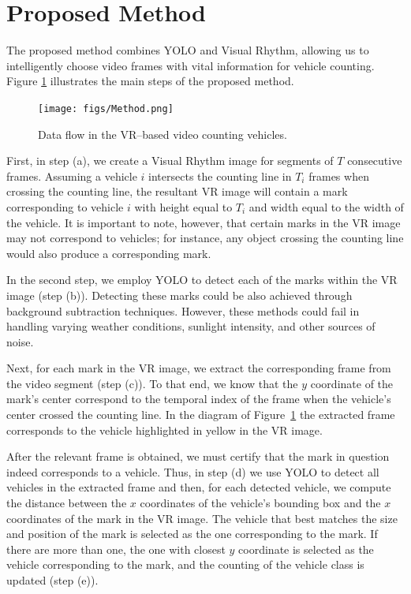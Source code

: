 \documentclass[10pt,conference]{IEEEtran}
\newcommand{\nina}[1]{{\color{purple}#1}}
\begin{document}
\section{Proposed Method}
The proposed method combines YOLO and Visual Rhythm, allowing us to intelligently choose video frames with vital information for vehicle counting. %
Figure \ref{fig:method} illustrates the main steps of the proposed method.

\begin{figure}[!t]
    \centering
    \texttt{[image: figs/Method.png]}
    \caption{Data flow in the VR–based video counting vehicles.}
    \label{fig:method}
\end{figure}

First, in step (a), we create a Visual Rhythm image for segments of $T$ consecutive frames. Assuming a vehicle $i$ intersects the counting line in $T_i$ frames when crossing the counting line, the resultant VR image will contain a mark corresponding to vehicle $i$ with height equal to $T_i$ and width equal to the width of the vehicle. It is important to note, however, that certain marks in the VR image may not correspond to vehicles; for instance, any object crossing the counting line would also produce a corresponding mark. 

In the second step, we employ YOLO to detect each of the marks within the VR image (step (b)). Detecting these marks could be also achieved through background subtraction techniques. However, these methods could fail in handling varying weather conditions, sunlight intensity, and other sources of noise.

Next, for each mark in the VR image, we extract the corresponding frame from the video segment (step (c)). To that end, we know that the $y$ coordinate of the mark's center correspond to the temporal index of the frame when the vehicle's center crossed the counting line. In the diagram of Figure~\ref{fig:method} the extracted frame corresponds to the vehicle highlighted in yellow in the VR image.

After the relevant frame is obtained, we must certify that the mark in question indeed corresponds to a vehicle. Thus, in step (d) we use YOLO to detect all vehicles in the extracted frame and then, for each detected vehicle, we compute the distance between the $x$ coordinates of the vehicle's bounding box and the $x$ coordinates of the mark in the VR image. The vehicle that best matches the size and position of the mark is selected as the one corresponding to the mark. If there are more than one, the one with closest $y$ coordinate is selected as the vehicle corresponding to the mark, and the counting of the vehicle class is updated (step (e)).
\end{document}
